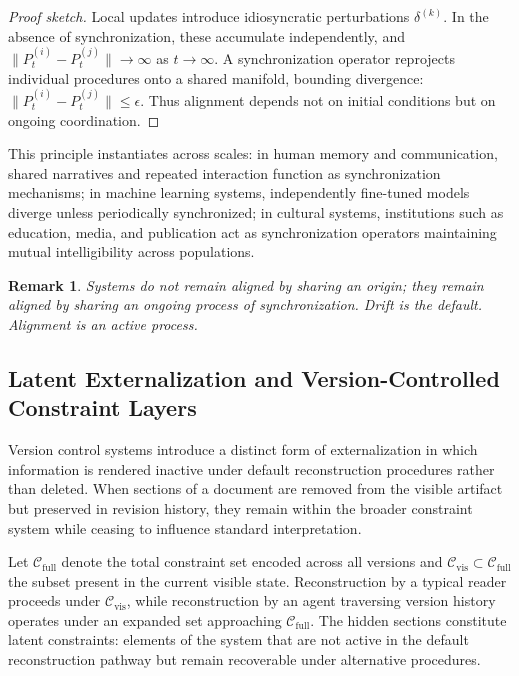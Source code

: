 \documentclass[12pt, letterpaper]{article}
\theoremstyle{flyxion}
\newtheorem*{remark}{Remark}
\begin{document}
\begin{proof}[Proof sketch]
Local updates introduce idiosyncratic perturbations $\delta^{(k)}$. In the absence of synchronization, these accumulate independently, and $\|P_t^{(i)} - P_t^{(j)}\| \to \infty$ as $t \to \infty$. A synchronization operator reprojects individual procedures onto a shared manifold, bounding divergence: $\|P_t^{(i)} - P_t^{(j)}\| \leq \epsilon$. Thus alignment depends not on initial conditions but on ongoing coordination.
\end{proof}

This principle instantiates across scales: in human memory and communication, shared narratives and repeated interaction function as synchronization mechanisms; in machine learning systems, independently fine-tuned models diverge unless periodically synchronized; in cultural systems, institutions such as education, media, and publication act as synchronization operators maintaining mutual intelligibility across populations.

\begin{remark}
Systems do not remain aligned by sharing an origin; they remain aligned by sharing an ongoing process of synchronization. Drift is the default. Alignment is an active process.
\end{remark}

\subsection{Latent Externalization and Version-Controlled Constraint Layers}

Version control systems introduce a distinct form of externalization in which information is rendered inactive under default reconstruction procedures rather than deleted. When sections of a document are removed from the visible artifact but preserved in revision history, they remain within the broader constraint system while ceasing to influence standard interpretation.

Let $\mathcal{C}_\mathrm{full}$ denote the total constraint set encoded across all versions and $\mathcal{C}_\mathrm{vis} \subset \mathcal{C}_\mathrm{full}$ the subset present in the current visible state. Reconstruction by a typical reader proceeds under $\mathcal{C}_\mathrm{vis}$, while reconstruction by an agent traversing version history operates under an expanded set approaching $\mathcal{C}_\mathrm{full}$. The hidden sections constitute latent constraints: elements of the system that are not active in the default reconstruction pathway but remain recoverable under alternative procedures.
\end{document}
